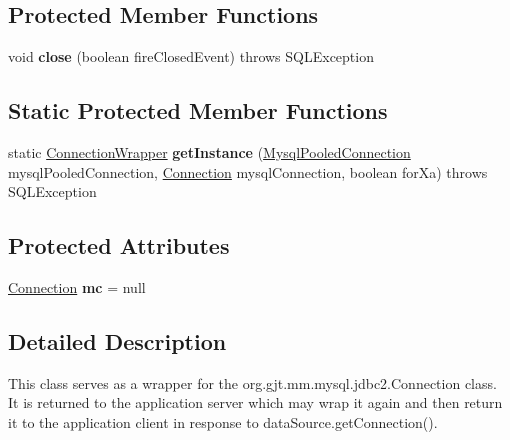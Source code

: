 \subsection*{Protected Member Functions}
\begin{DoxyCompactItemize}
\item 
\mbox{\label{classcom_1_1mysql_1_1jdbc_1_1jdbc2_1_1optional_1_1_connection_wrapper_a3c5cc8b6cfbfff6b9c4880f2280baf55}} 
void {\bfseries close} (boolean fire\+Closed\+Event)  throws S\+Q\+L\+Exception 
\end{DoxyCompactItemize}
\subsection*{Static Protected Member Functions}
\begin{DoxyCompactItemize}
\item 
\mbox{\label{classcom_1_1mysql_1_1jdbc_1_1jdbc2_1_1optional_1_1_connection_wrapper_ae0211de12f37f53f46d3c34906db4715}} 
static \mbox{\hyperlink{classcom_1_1mysql_1_1jdbc_1_1jdbc2_1_1optional_1_1_connection_wrapper}{Connection\+Wrapper}} {\bfseries get\+Instance} (\mbox{\hyperlink{classcom_1_1mysql_1_1jdbc_1_1jdbc2_1_1optional_1_1_mysql_pooled_connection}{Mysql\+Pooled\+Connection}} mysql\+Pooled\+Connection, \mbox{\hyperlink{interfacecom_1_1mysql_1_1jdbc_1_1_connection}{Connection}} mysql\+Connection, boolean for\+Xa)  throws S\+Q\+L\+Exception 
\end{DoxyCompactItemize}
\subsection*{Protected Attributes}
\begin{DoxyCompactItemize}
\item 
\mbox{\label{classcom_1_1mysql_1_1jdbc_1_1jdbc2_1_1optional_1_1_connection_wrapper_a327e37725d554607ae729444868c0a08}} 
\mbox{\hyperlink{interfacecom_1_1mysql_1_1jdbc_1_1_connection}{Connection}} {\bfseries mc} = null
\end{DoxyCompactItemize}


\subsection{Detailed Description}
This class serves as a wrapper for the org.\+gjt.\+mm.\+mysql.\+jdbc2.\+Connection class. It is returned to the application server which may wrap it again and then return it to the application client in response to data\+Source.\+get\+Connection().


